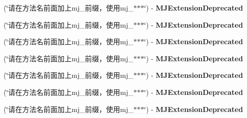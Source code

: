 \begin{DoxyCompactItemize}
(\char`\"{}请在方法名前面加上mj\+\_\+前缀，使用mj\+\_\+$\ast$$\ast$$\ast$\char`\"{}) -\/ {\bfseries M\+J\+Extension\+Deprecated}
\item 
\mbox{\label{category_n_s_string_07_m_j_extension_deprecated__v__2__5__16_08_ab08e53dd4b8481f26934085e7ff40d45}} 
(\char`\"{}请在方法名前面加上mj\+\_\+前缀，使用mj\+\_\+$\ast$$\ast$$\ast$\char`\"{}) -\/ {\bfseries M\+J\+Extension\+Deprecated}
\item 
\mbox{\label{category_n_s_string_07_m_j_extension_deprecated__v__2__5__16_08_ab08e53dd4b8481f26934085e7ff40d45}} 
(\char`\"{}请在方法名前面加上mj\+\_\+前缀，使用mj\+\_\+$\ast$$\ast$$\ast$\char`\"{}) -\/ {\bfseries M\+J\+Extension\+Deprecated}
\item 
\mbox{\label{category_n_s_string_07_m_j_extension_deprecated__v__2__5__16_08_ab08e53dd4b8481f26934085e7ff40d45}} 
(\char`\"{}请在方法名前面加上mj\+\_\+前缀，使用mj\+\_\+$\ast$$\ast$$\ast$\char`\"{}) -\/ {\bfseries M\+J\+Extension\+Deprecated}
\item 
\mbox{\label{category_n_s_string_07_m_j_extension_deprecated__v__2__5__16_08_ab08e53dd4b8481f26934085e7ff40d45}} 
(\char`\"{}请在方法名前面加上mj\+\_\+前缀，使用mj\+\_\+$\ast$$\ast$$\ast$\char`\"{}) -\/ {\bfseries M\+J\+Extension\+Deprecated}
\item 
\mbox{\label{category_n_s_string_07_m_j_extension_deprecated__v__2__5__16_08_ab08e53dd4b8481f26934085e7ff40d45}} 
(\char`\"{}请在方法名前面加上mj\+\_\+前缀，使用mj\+\_\+$\ast$$\ast$$\ast$\char`\"{}) -\/ {\bfseries M\+J\+Extension\+Deprecated}
\item 
\mbox{\label{category_n_s_string_07_m_j_extension_deprecated__v__2__5__16_08_ab08e53dd4b8481f26934085e7ff40d45}} 
(\char`\"{}请在方法名前面加上mj\+\_\+前缀，使用mj\+\_\+$\ast$$\ast$$\ast$\char`\"{}) -\/ {\bfseries M\+J\+Extension\+Deprecated}
\item 
\mbox{\label{category_n_s_string_07_m_j_extension_deprecated__v__2__5__16_08_ab08e53dd4b8481f26934085e7ff40d45}} 

\end{DoxyCompactItemize}

